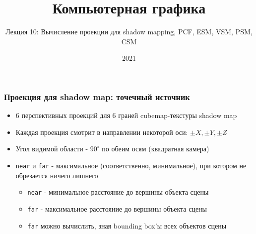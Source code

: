 \documentclass{beamer}
\title{Компьютерная графика}
\subtitle{Лекция 10: Вычисление проекции для shadow mapping, PCF, ESM, VSM, PSM, CSM}
\date{2021}
\begin{document}
\frame{\titlepage}

\begin{frame}[fragile]
\frametitle{Проекция для shadow map: точечный источник}
\begin{itemize}
\item 6 перспективных проекций для 6 граней cubemap-текстуры shadow map
\pause
\item Каждая проекция смотрит в направлении некоторой оси: \begin{math}\pm X, \pm Y, \pm Z\end{math}
\pause
\item Угол видимой области - \begin{math}90^\circ\end{math} по обеим осям (квадратная камера)
\pause
\item \verb|near| и \verb|far| - максимальное (соответственно, минимальное), при котором не обрезается ничего лишнего
\pause
\begin{itemize}
\item \verb|near| - минимальное расстояние до вершины объекта сцены
\item \verb|far| - максимальное расстояние до вершины объекта сцены
\pause
\item \verb|far| можно вычислить, зная bounding box'ы всех объектов сцены
\end{itemize}
\end{itemize}
\end{frame}
\end{document}
